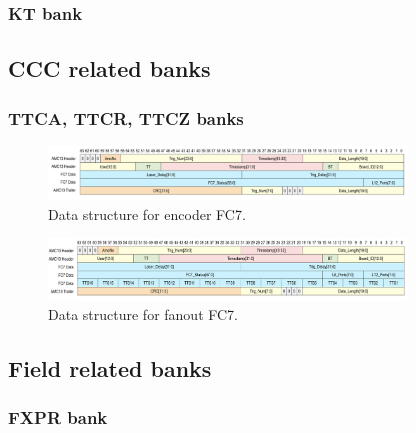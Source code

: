 \subsubsection*{KT bank}

\subsection{CCC related banks}

\subsubsection*{TTCA, TTCR, TTCZ banks}

\begin{figure}[htbp]
\centering
\includegraphics[width=0.85\textwidth]{pics/EncoderFC7.pdf} 
\caption{Data structure for encoder FC7.}\label{fig:EncoderFC7}
\end{figure}

\begin{figure}[htbp]
\centering
\includegraphics[width=0.85\textwidth]{pics/FanoutFC7.pdf} 
\caption{Data structure for fanout FC7.}\label{fig:FanoutFC7}
\end{figure}


\subsection{Field related banks}

\subsubsection*{FXPR bank}



